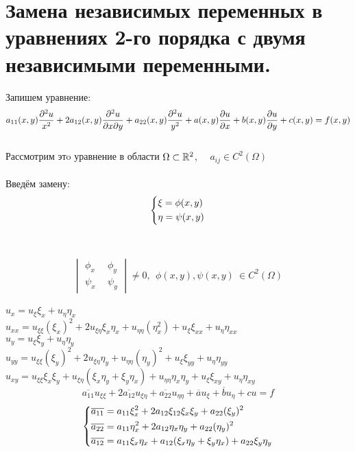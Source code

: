\documentclass[../main.tex]{subfiles}
\begin{document}
\section{Замена независимых переменных в уравнениях 2-го порядка с двумя независимыми переменными.}
Запишем уравнение:
\begin{equation}\label{eq:1.6.1}
	a_{11}(x,y)\frac{\partial^2u}{x^2} + 2a_{12}(x,y)\frac{\partial^2u}{\partial x \partial y} + a_{22}(x,y)\frac{\partial^2u}{y^2} + a(x,y)\frac{\partial u}{\partial x} +b(x,y)\frac{\partial u}{\partial y}+c(x,y) = f(x,y) \end{equation} \\
Рассмотрим этo уравнение в области $\Omega \subset \mathbb{R}^2$, \ \ $a_{ij} \in C^2(\Omega)$ \\
\\ Введём замену:
$$\begin{dcases}\xi = \phi(x,y) \\ \eta = \psi(x,y)\end{dcases}$$
\\ \\
$$\begin{vmatrix}
		\phi_x \  & \ \phi_y
		\\
		\psi_x \  & \ \psi_y
	\end{vmatrix} \ne 0, \ \ \phi(x,y), \psi(x,y) \ \in C^2(\Omega)
$$ \\
$
	u_x = u_\xi\xi_{x}+u_\eta\eta_x
$  \\$
u_{xx} = u_{\xi\xi}(\xi_x)^2 + 2u_{\xi\eta}\xi_x\eta_x+u_{\eta\eta}(\eta_x^2)+u_\xi\xi_{xx}+u_\eta\eta_{xx}
$\\ $
u_y=u_\xi\xi_y+u_\eta\eta_y
$\\
$u_{yy}=u_{\xi\xi}(\xi_y)^2+2u_{\xi\eta}\eta_y+u_{\eta\eta}(\eta_y)^2+u_\xi\xi_{yy}+u_\eta\eta_{yy}$\\
$u_{xy}=u_{\xi\xi}\xi_{x}\xi_y+u_{\xi\eta}(\xi_x\eta_y+\xi_y\eta_x)+u_{\eta\eta}\eta_x\eta_y+u_\xi\xi_{xy}+u_\eta\eta_{xy}$ \\
	\begin{equation}
		\overline{a_{11}}u_{\xi\xi}+2\overline{a_{12}}u_{\xi\eta}+\overline{a_{22}}u_{\eta\eta}+\overline{a}u_{\xi}+\overline{b}u_\eta+cu=f
	\end{equation}
	\begin{equation}
		\begin{dcases}
			\overline{a_{11}}=a_{11}\xi_x^2+2a_{12}\xi_{12}\xi_x\xi_y+a_{22}(\xi_y)^2
			\\
			\overline{a_{22}}=a_{11}\eta_x^2+2a_{12}\eta_x\eta_y+a_{22}(\eta_y)^2
			\\
			\overline{a_{12}}=a_{11}\xi_x\eta_x+a_{12}(\xi_x\eta_y+\xi_y\eta_x)+a_{22}\xi_y\eta_y
		\end{dcases}
	\end{equation}
\end{document}
